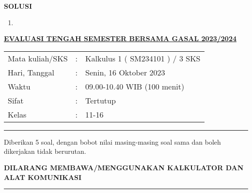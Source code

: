 \documentclass[10pt,openany,a4paper]{article}
\renewcommand{\headrulewidth}{0pt}
\begin{document}
    \newpage
    \fancyfoot{}
    {\centering\textbf{SOLUSI}}
    \renewcommand{\headrulewidth}{1pt}
    \begin{enumerate}
        \item 
    \end{enumerate}
    \newpage
    \fancyhead{}
    \fancyhead[r]{}
    \renewcommand{\headrulewidth}{0pt}

    \begin{center}
	{\underline{\textbf{\MakeUppercase{Evaluasi Tengah Semester Bersama Gasal 2023/2024}}}}
    \end{center}

    \begin{center}
	\begin{tabular}{lcl}
		Mata kuliah/SKS & : & Kalkulus 1 ( SM234101 ) / 3 SKS\\
		Hari, Tanggal & : & Senin, 16 Oktober 2023\\
		Waktu & : & 09.00-10.40 WIB (100 menit)\\
		Sifat & : & Tertutup\\
		Kelas & : & 11-16
	\end{tabular}
    \end{center}
	
    \noindent\rule{\textwidth}{2.pt}
	
    \setlength{\parindent}{5pt}
    \par Diberikan 5 soal, dengan bobot nilai masing-masing soal sama dan boleh dikerjakan tidak berurutan.
    \setlength{\parindent}{5pt}
    \setlength{\parindent}{5pt}
    {\small
    \par \textbf{\MakeUppercase{Dilarang membawa/menggunakan kalkulator dan alat komunikasi}}
    }
    \par {}
	
    \noindent\rule{\textwidth}{2.pt}
	
\end{document}
